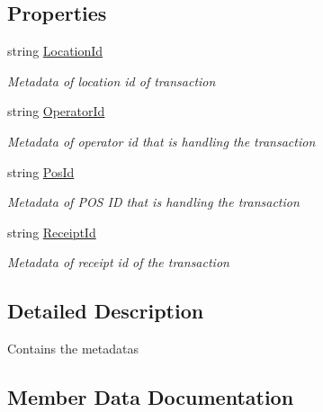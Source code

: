 \subsection*{Properties}
\begin{DoxyCompactItemize}
\item 
string \hyperlink{class_giift_a_p_i_c_sharp_1_1_transaction_info_abe5c8078a8877db405405e90064aab7b}{Location\+Id}
\begin{DoxyCompactList}\small\item\em Metadata of location id of transaction \end{DoxyCompactList}\item 
string \hyperlink{class_giift_a_p_i_c_sharp_1_1_transaction_info_a4828edf8dee240cc451c5b024a93985f}{Operator\+Id}
\begin{DoxyCompactList}\small\item\em Metadata of operator id that is handling the transaction \end{DoxyCompactList}\item 
string \hyperlink{class_giift_a_p_i_c_sharp_1_1_transaction_info_af8d8ffb90d3ca9b52337486d526c1a5d}{Pos\+Id}
\begin{DoxyCompactList}\small\item\em Metadata of P\+OS ID that is handling the transaction \end{DoxyCompactList}\item 
string \hyperlink{class_giift_a_p_i_c_sharp_1_1_transaction_info_a7b71bf0dd9d75193538b8dc76e9426c9}{Receipt\+Id}
\begin{DoxyCompactList}\small\item\em Metadata of receipt id of the transaction \end{DoxyCompactList}\end{DoxyCompactItemize}


\subsection{Detailed Description}
Contains the metadatas 



\subsection{Member Data Documentation}
\mbox{\label{class_giift_a_p_i_c_sharp_1_1_transaction_info_ad06b9186a125211e11fa7a6f90314c17}} 

